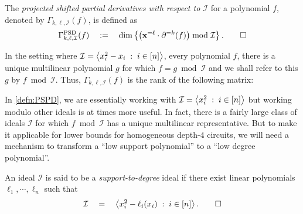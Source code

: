  \begin{definition} \label{defn:PSPD-ideal}
The \emph{projected shifted partial derivatives with respect to $\mathcal{I}$} for a polynomial $f$, denoted by $\Gamma_{k,\ell,\mathcal{I}}(f)$, is defined as 
\[
\Gamma^{\mathrm{PSD}}_{k,\ell,\mathcal{I}}(f) \quad := \quad \dim \left\{\left(\mathbf{x}^{=\ell} \cdot \partial^{=k}(f)\right) \bmod \mathcal{I}\right\}.\qedhere
\]
\end{definition}
\noindent
In the setting where $\mathcal{I} = \left\langle x_i^2 - x_i\;:\; i\in [n]\right\rangle$, every polynomial $f$, there is a unique multilinear polynomial $g$ for which $f = g \bmod \mathcal{I}$ and we shall refer to this $g$ by $f \bmod \mathcal{I}$. Thus, $\Gamma_{k,\ell,\mathcal{I}}(f)$ is the rank of the following matrix:


\noindent In \autoref{defn:PSPD}, we are essentially working with
$\mathcal{I} = \left\langle x_i^2 \;:\; i\in [n]\right\rangle$ but working modulo other ideals is at times more useful.
In fact, there is a fairly large class of ideals $\mathcal{I}$ for which $f \bmod \mathcal{I}$ has a unique multilinear representative. But to make it applicable for lower bounds for homogeneous depth-$4$ circuits, we will need a mechanism to transform a ``low support polynomial'' to a ``low degree polynomial''. 

\begin{definition}\label{defn:supp-to-degree-ideal}
An ideal $\mathcal{I}$ is said to be a \emph{support-to-degree} ideal if there exist linear polynomials $\ell_1, \cdots, \ell_n$ such that
\[
\mathcal{I} \quad = \quad \left\langle x_i^2 - \ell_i(x_i) \;:\; i\in [n]\right\rangle. \qedhere
\]
\end{definition}

